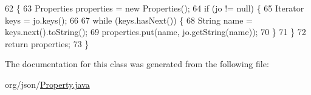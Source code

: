 \begin{DoxyCode}
62                                                                                \{
63         Properties  properties = \textcolor{keyword}{new} Properties();
64         \textcolor{keywordflow}{if} (jo != null) \{
65             Iterator keys = jo.keys();
66 
67             \textcolor{keywordflow}{while} (keys.hasNext()) \{
68                 String name = keys.next().toString();
69                 properties.put(name, jo.getString(name));
70             \}
71         \}
72         \textcolor{keywordflow}{return} properties;
73     \}
\end{DoxyCode}


The documentation for this class was generated from the following file\-:\begin{DoxyCompactItemize}
\item 
org/json/\hyperlink{_property_8java}{Property.\-java}\end{DoxyCompactItemize}
